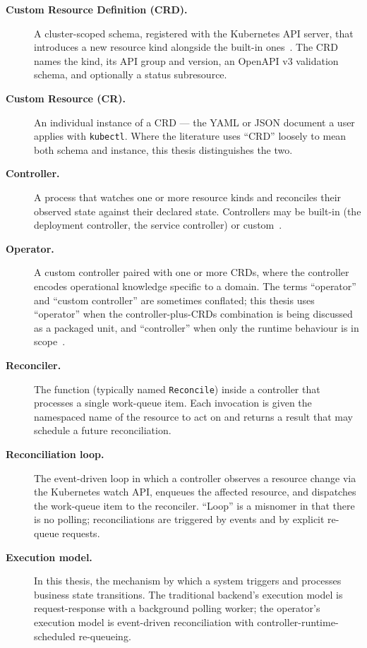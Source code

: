 \begin{description}
    \item[\textbf{Custom Resource Definition (CRD).}] A cluster-scoped schema, registered with the Kubernetes API server, that introduces a new resource kind alongside the built-in ones~\cite{crd_kubernetes, hausenblas2019}. The CRD names the kind, its API group and version, an OpenAPI v3 validation schema, and optionally a status subresource.

    \item[\textbf{Custom Resource (CR).}] An individual instance of a CRD --- the YAML or JSON document a user applies with \texttt{kubectl}. Where the literature uses ``CRD'' loosely to mean both schema and instance, this thesis distinguishes the two.

    \item[\textbf{Controller.}] A process that watches one or more resource kinds and reconciles their observed state against their declared state. Controllers may be built-in (the deployment controller, the service controller) or custom~\cite{controller_pattern, ibryam2020}.

    \item[\textbf{Operator.}] A custom controller paired with one or more CRDs, where the controller encodes operational knowledge specific to a domain. The terms ``operator'' and ``custom controller'' are sometimes conflated; this thesis uses ``operator'' when the controller-plus-CRDs combination is being discussed as a packaged unit, and ``controller'' when only the runtime behaviour is in scope~\cite{operator_pattern, dobies2020}.

    \item[\textbf{Reconciler.}] The function (typically named \texttt{Reconcile}) inside a controller that processes a single work-queue item. Each invocation is given the namespaced name of the resource to act on and returns a result that may schedule a future reconciliation.

    \item[\textbf{Reconciliation loop.}] The event-driven loop in which a controller observes a resource change via the Kubernetes watch API, enqueues the affected resource, and dispatches the work-queue item to the reconciler. ``Loop'' is a misnomer in that there is no polling; reconciliations are triggered by events and by explicit re-queue requests.

    \item[\textbf{Execution model.}] In this thesis, the mechanism by which a system triggers and processes business state transitions. The traditional backend's execution model is request-response with a background polling worker; the operator's execution model is event-driven reconciliation with controller-runtime-scheduled re-queueing.


\end{description}
